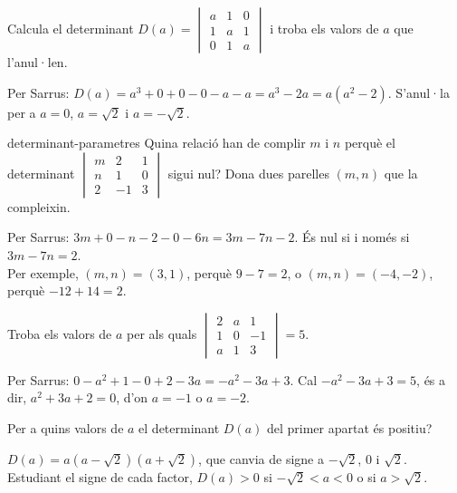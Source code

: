\begin{apartats}

Calcula el determinant $D(a)=\begin{vmatrix}a&1&0\\1&a&1\\0&1&a\end{vmatrix}$ i troba els valors de $a$
que l'anul·len.

\begin{solucio}
Per Sarrus: $D(a)=a^3+0+0-0-a-a=a^3-2a=a(a^2-2)$. S'anul·la per a $a=0$, $a=\sqrt2$ i $a=-\sqrt2$.
\end{solucio}

\begin{tria}{determinant-parametres}
Quina relació han de complir $m$ i $n$ perquè el determinant
$\begin{vmatrix}m&2&1\\n&1&0\\2&-1&3\end{vmatrix}$ sigui nul? Dona dues parelles $(m,n)$ que la
compleixin.

\begin{solucio}
Per Sarrus: $3m+0-n-2-0-6n=3m-7n-2$. És nul si i només si $3m-7n=2$.\\
Per exemple, $(m,n)=(3,1)$, perquè $9-7=2$, o $(m,n)=(-4,-2)$, perquè $-12+14=2$.
\end{solucio}

Troba els valors de $a$ per als quals $\begin{vmatrix}2&a&1\\1&0&-1\\a&1&3\end{vmatrix}=5$.

\begin{solucio}
Per Sarrus: $0-a^2+1-0+2-3a=-a^2-3a+3$. Cal $-a^2-3a+3=5$, és a dir, $a^2+3a+2=0$, d'on
$a=-1$ o $a=-2$.
\end{solucio}
\end{tria}

\begin{nomesllarg}
Per a quins valors de $a$ el determinant $D(a)$ del primer apartat és positiu?

\begin{solucio}
$D(a)=a(a-\sqrt2)(a+\sqrt2)$, que canvia de signe a $-\sqrt2$, $0$ i $\sqrt2$. Estudiant el signe de cada
factor, $D(a)>0$ si $-\sqrt2<a<0$ o si $a>\sqrt2$.
\end{solucio}
\end{nomesllarg}

\end{apartats}
